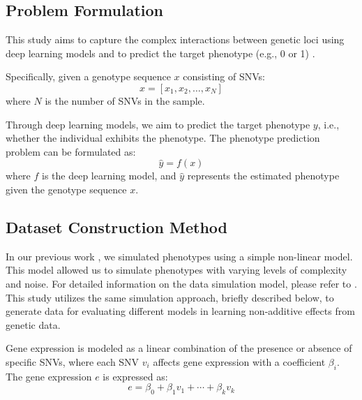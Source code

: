 \documentclass{article}
\begin{document}
\subsection{Problem Formulation}

This study aims to capture the complex interactions between genetic loci using deep learning models and to predict the target phenotype (e.g., 0 or 1) .

Specifically, given a genotype sequence \( x \) consisting of SNVs:
\begin{equation}
x = [x_1, x_2, \dots, x_N]
\end{equation}
where \( N \) is the number of SNVs in the sample.

Through deep learning models, we aim to predict the target phenotype \( y \), i.e., whether the individual exhibits the phenotype. The phenotype prediction problem can be formulated as:
\begin{equation}
\hat{y} = f(x)
\end{equation}
where \( f \) is the deep learning model, and \( \hat{y} \) represents the estimated phenotype given the genotype sequence \( x \).


\subsection{Dataset Construction Method}
\label{sec:dataset-construction}
In our previous work \parencite{kieransimulatepaper}, we simulated phenotypes using a simple non-linear model. This model allowed us to simulate phenotypes with varying levels of complexity and noise. For detailed information on the data simulation model, please refer to \parencite{kieransimulatepaper}. This study utilizes the same simulation approach, briefly described below, to generate data for evaluating different models in learning non-additive effects from genetic data.


Gene expression is modeled as a linear combination of the presence or absence of specific SNVs, where each SNV \( v_i \) affects gene expression with a coefficient \( \beta_i \). The gene expression \( e \) is expressed as:
\begin{equation}
e = \beta_0 + \beta_1 v_1 + \cdots + \beta_k v_k
\end{equation}
\end{document}
